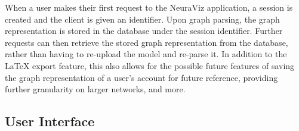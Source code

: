 When a user makes their first request to the NeuraViz application, a session is created and the client is given an identifier. Upon graph parsing, the graph representation is stored in the database under the session identifier. Further requests can then retrieve the stored graph representation from the database, rather than having to re-upload the model and re-parse it. In addition to the LaTeX export feature, this also allows for the possible future features of saving the graph representation of a user's account for future reference, providing further granularity on larger networks, and more.

\subsection{User Interface}
